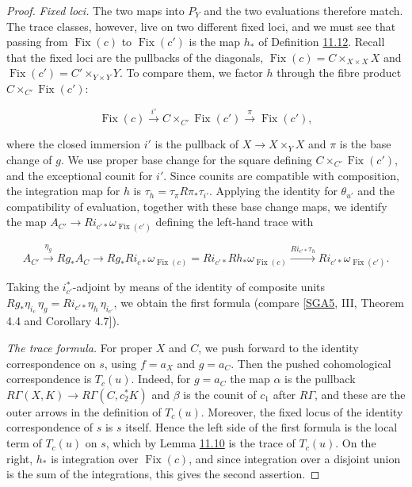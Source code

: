 \documentclass[11pt]{article}
\providecommand{\Fix}{}\renewcommand{\Fix}{\operatorname{Fix}}
\begin{document}
\begin{proof}[{Proof}]
\emph{Fixed loci.} The two maps into \(P_Y\) and the two evaluations therefore match. The trace classes, however, live on two different fixed loci, and we must see that passing from \(\Fix(c)\) to \(\Fix(c')\) is the map \(h_*\) of Definition \hyperref[bp204]{11.12}. Recall that the fixed loci are the pullbacks of the diagonals, \(\Fix(c)=C\times_{X\times X}X\) and \(\Fix(c')=C'\times_{Y\times Y}Y\). To compare them, we factor \(h\) through the fibre product \(C\times_{C'}\Fix(c')\):

\[
\Fix(c)\xrightarrow{i'}C\times_{C'}\Fix(c')\xrightarrow{\pi}\Fix(c'),
\]

where the closed immersion \(i'\) is the pullback of \(X\to X\times_YX\) and \(\pi\) is the base change of \(g\). We use proper base change for the square defining \(C\times_{C'}\Fix(c')\), and the exceptional counit for \(i'\). Since counits are compatible with composition, the integration map for \(h\) is \(\tau_h=\tau_\pi R\pi_*\tau_{i'}\). Applying the identity for \(\theta_{u'}\) and the compatibility of evaluation, together with these base change maps, we identify the map \(A_{C'}\to Ri_{c'*}\omega_{\Fix(c')}\) defining the left-hand trace with

\[
A_{C'}\xrightarrow{\eta_g}Rg_*A_C
\longrightarrow Rg_*Ri_{c*}\omega_{\Fix(c)}
=Ri_{c'*}Rh_*\omega_{\Fix(c)}
\xrightarrow{Ri_{c'*}\tau_h}Ri_{c'*}\omega_{\Fix(c')}.
\]

Taking the \(i_{c'}^*\)-adjoint by means of the identity of composite units \(Rg_*\eta_{i_c}\,\eta_g=Ri_{c'*}\eta_h\,\eta_{i_{c'}}\), we obtain the first formula (compare [\hyperref[bp332]{SGA5}, III, Theorem 4.4 and Corollary 4.7]).

\emph{The trace formula.} For proper \(X\) and \(C\), we push forward to the identity correspondence on \(s\), using \(f=a_X\) and \(g=a_C\). Then the pushed cohomological correspondence is \(T_c(u)\). Indeed, for \(g=a_C\) the map \(\alpha\) is the pullback \(R\Gamma(X,K)\to R\Gamma(C,c_2^*K)\) and \(\beta\) is the counit of \(c_1\) after \(R\Gamma\), and these are the outer arrows in the definition of \(T_c(u)\). Moreover, the fixed locus of the identity correspondence of \(s\) is \(s\) itself. Hence the left side of the first formula is the local term of \(T_c(u)\) on \(s\), which by Lemma \hyperref[bp199]{11.10} is the trace of \(T_c(u)\). On the right, \(h_*\) is integration over \(\Fix(c)\), and since integration over a disjoint union is the sum of the integrations, this gives the second assertion.
\end{proof}
\end{document}
